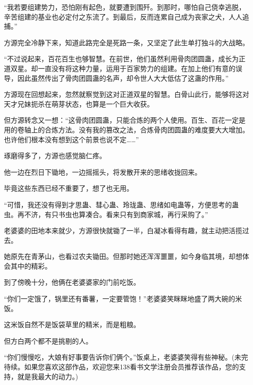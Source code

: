 \begin{this_body}
“我若要组建势力，恐怕刚有起色，就要遭到围歼。到那时，哪怕自己侥幸逃脱，辛苦组建的基业也必定付之东流了。到最后，反而连累自己成为丧家之犬，人人追捕。”

方源完全冷静下来，知道此路完全是死路一条，又坚定了此生单打独斗的大战略。

“不过说起来，百花百生也够智慧。在前世，他们虽然利用骨肉团圆蛊，成长为正道双星。却一直没有将这种力量，运用于百家势力的组建。在加上他们有意的误导，因此虽然传出了骨肉团圆蛊的名声，却令世人大大低估了这蛊的作用。”

方源现在回想起来，忽然就察觉到这对正道双星的智慧。白骨山此行，能够将这对天才兄妹扼杀在萌芽状态，也算是一个巨大收获。

但方源转念又一想：“这骨肉团圆蛊，只能合炼的两个人使用。百生、百花一定是用的卷轴上的合炼方法。没有我的篡改之法，合炼骨肉团圆蛊的难度要大大增加。也许他们根本没有想到这个前景也说不定……”

琢磨得多了，方源也感觉脑仁疼。

他一边在烈日下锄地，一边摇摇头，将发散开来的思绪收拢回来。

毕竟这些东西已经不重要了，想了也无用。

“可惜，我还没有得到才思蛊、彗心蛊、玲珑蛊、思绪如电蛊等，方便思考的蛊虫。再不济，有只书虫也算凑合。看来只有到商家城，再行采购了。”

老婆婆的田地本来就少，方源很快就锄了一半，白凝冰看得有趣，就主动把活揽过去。

她原先在青茅山，也看过农夫锄田。但那时她还浑浑噩噩，如今身临其境，却想体会其中的精彩。

到了傍晚十分，他俩在老婆婆家的门前吃饭。

“你们一定饿了，锅里还有番薯，一定要管饱！”老婆婆笑眯眯地盛了两大碗的米饭。

这米饭自然不是饭袋草里的精米，而是粗粮。

但方白两个都不是挑剔的人。

“你们慢慢吃，大娘有好事要告诉你们俩个。”饭桌上，老婆婆笑得有些神秘。(未完待续。如果您喜欢这部作品，欢迎您来138看书文学注册会员推荐该作品，您的支持，就是我最大的动力。)

\end{this_body}


